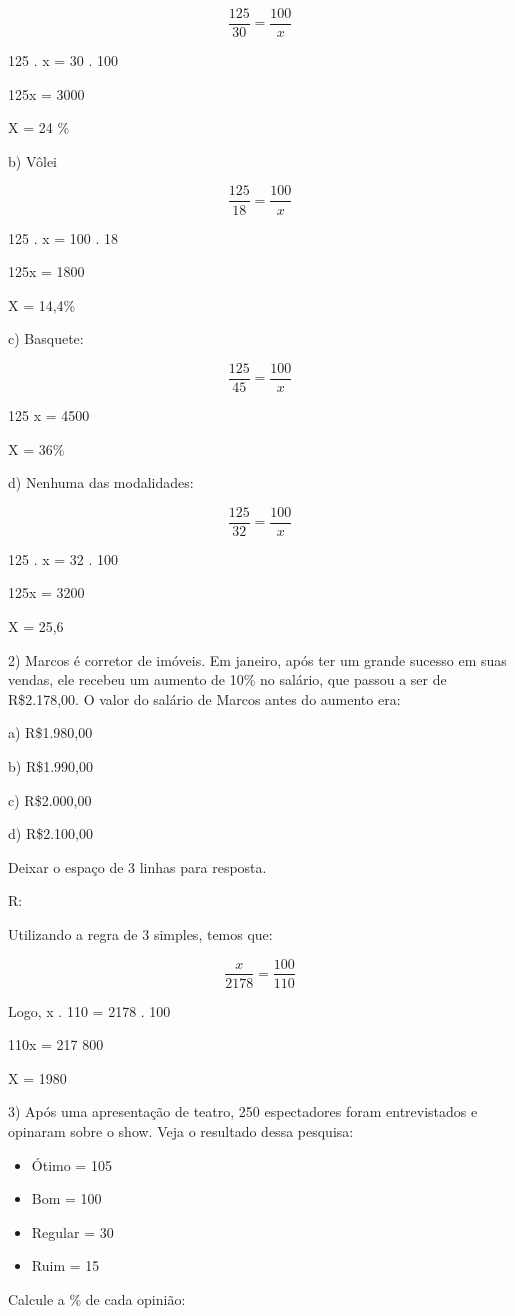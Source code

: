 \[\frac {125}{30} = \frac {100}{x}\]

125 . x = 30 . 100

125x = 3000

X = 24 \%

b) Vôlei

\[\frac {125}{18} = \frac {100}{x}\]

125 . x = 100 . 18

125x = 1800

X = 14,4\%

c) Basquete:

\[\frac {125}{45} = \frac {100}{x}\]

125 x = 4500

X = 36\%

d) Nenhuma das modalidades:

\[\frac {125}{32} = \frac {100}{x}\]

125 . x = 32 . 100

125x = 3200

X = 25,6

2) Marcos é corretor de imóveis. Em janeiro, após ter um grande sucesso
em suas vendas, ele recebeu um aumento de 10\% no salário, que passou a
ser de R\$2.178,00. O valor do salário de Marcos antes do aumento era:

a) R\$1.980,00

b) R\$1.990,00

c) R\$2.000,00

d) R\$2.100,00

Deixar o espaço de 3 linhas para resposta.

R:

Utilizando a regra de 3 simples, temos que:

\[\frac {x}{2178} = \frac {100}{110}\]

Logo, x . 110 = 2178 . 100

110x = 217 800

X = 1980

3) Após uma apresentação de teatro, 250 espectadores foram entrevistados
e opinaram sobre o show. Veja o resultado dessa pesquisa:

\begin{itemize}
\item
  Ótimo = 105
\item
  Bom = 100
\item
  Regular = 30
\item
  Ruim = 15
\end{itemize}

Calcule a \% de cada opinião:

